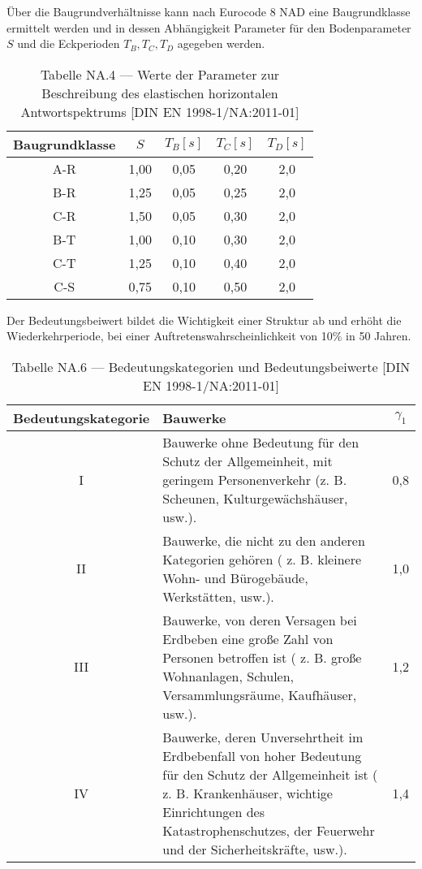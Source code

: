 Über die Baugrundverhältnisse kann nach Eurocode 8 NAD eine Baugrundklasse ermittelt werden und in dessen Abhängigkeit Parameter für den Bodenparameter $S$ und die Eckperioden $T_B, T_C, T_D$ agegeben werden.

\begin{table}[H]
\centering
\begin{tabular}{ |c|c|c|c|c| } 
 \hline
 Baugrundklasse & $S$ & $T_B [s]$ & $T_C [s]$ & $T_D [s]$\\
 \hline\hline
 A-R  & 1,00 & 0,05 & 0,20 & 2,0\\ 
 B-R  & 1,25 & 0,05 & 0,25 & 2,0\\ 
 C-R  & 1,50 & 0,05 & 0,30 & 2,0\\ 
 \hline
 B-T  & 1,00 & 0,10 & 0,30 & 2,0\\
 C-T  & 1,25 & 0,10 & 0,40 & 2,0\\
 \hline
 C-S  & 0,75 & 0,10 & 0,50 & 2,0\\
 \hline
\end{tabular}
\caption{Tabelle NA.4 — Werte der Parameter zur Beschreibung des elastischen horizontalen Antwortspektrums [DIN EN 1998-1/NA:2011-01]}
\end{table}

Der Bedeutungsbeiwert bildet die Wichtigkeit einer Struktur ab und erhöht die Wiederkehrperiode, bei einer Auftretenswahrscheinlichkeit von 10\% in 50 Jahren.

\begin{table}[H]
\centering
\begin{tabular}{ |c|p{9cm}|c| } 
 \hline
 Bedeutungskategorie & Bauwerke & $\gamma_1$\\
 \hline\hline
 I   & Bauwerke ohne Bedeutung für den Schutz der Allgemeinheit, mit geringem Personenverkehr (z. B. Scheunen, Kulturgewächshäuser, usw.). & 0,8\\
 \hline
 II  & Bauwerke, die nicht zu den anderen Kategorien gehören ( z. B. kleinere Wohn- und Bürogebäude, Werkstätten, usw.). & 1,0\\
 \hline
 III & Bauwerke, von deren Versagen bei Erdbeben eine große Zahl von Personen betroffen ist ( z. B. große Wohnanlagen, Schulen, Versammlungsräume, Kaufhäuser, usw.). & 1,2\\
 \hline
 IV  & Bauwerke, deren Unversehrtheit im Erdbebenfall von hoher Bedeutung für den Schutz der Allgemeinheit ist ( z. B. Krankenhäuser, wichtige Einrichtungen des Katastrophenschutzes, der Feuerwehr und der Sicherheitskräfte, usw.). & 1,4\\
 \hline
\end{tabular}
\caption{Tabelle NA.6 — Bedeutungskategorien und Bedeutungsbeiwerte [DIN EN 1998-1/NA:2011-01]}
\end{table}

